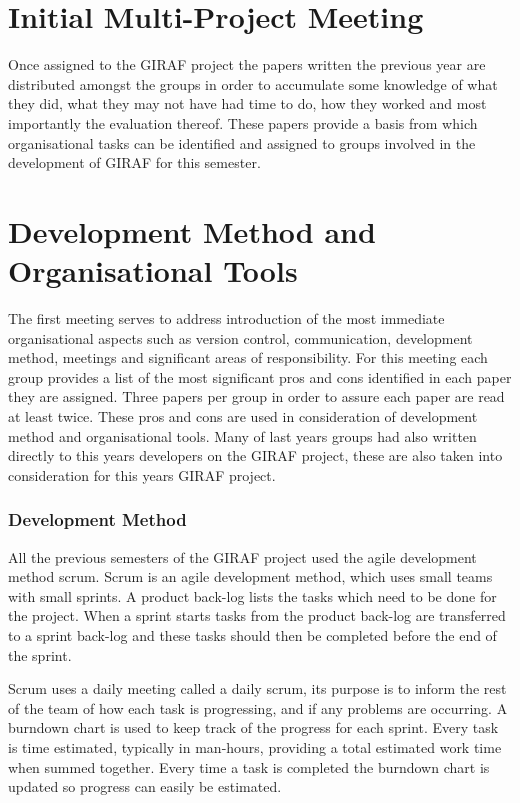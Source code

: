 \section{Initial Multi-Project Meeting}
Once assigned to the GIRAF project the papers written the previous year are distributed amongst the groups in order to accumulate some knowledge of what they did, what they may not have had time to do, how they worked and most importantly the evaluation thereof.
These papers provide a basis from which organisational tasks can be identified and assigned to groups involved in the development of GIRAF for this semester.

\section{Development Method and Organisational Tools}
The first meeting serves to address introduction of the most immediate organisational aspects such as version control, communication, development method, meetings and significant areas of responsibility.
For this meeting each group provides a list of the most significant pros and cons identified in each paper they are assigned.
Three papers per group in order to assure each paper are read at least twice.
These pros and cons are used in consideration of development method and organisational tools.
Many of last years groups had also written directly to this years developers on the GIRAF project, these are also taken into consideration for this years GIRAF project. 

\subsubsection*{Development Method}
All the previous semesters of the GIRAF project used the agile development method scrum.
Scrum is an agile development method, which uses small teams with small sprints. 
A product back-log lists the tasks which need to be done for the project. 
When a sprint starts tasks from the product back-log are transferred to a sprint back-log and these tasks should then be completed before the end of the sprint.

Scrum uses a daily meeting called a daily scrum, its purpose is to inform the rest of the team of how each task is progressing, and if any problems are occurring.
A burndown chart is used to keep track of the progress for each sprint. 
Every task is time estimated, typically in man-hours, providing a total estimated work time when summed together. 
Every time a task is completed the burndown chart is updated so progress can easily be estimated.

